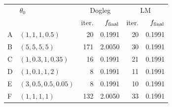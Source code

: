 \begin{tabular}{llrrrr}\toprule
& $\theta_0$ & \multicolumn{2}{c}{Dogleg} & \multicolumn{2}{c}{LM} \\
& & iter. & $f_{\rm final}$ & iter. & $f_{\rm final}$ \\\midrule
A & $(1, 1, 1, 0.5)$ & 20 & 0.1991 & 20 & 0.1991 \\
B & $(5, 5, 5, 5)$ & 171 & 2.0050 & 30 & 0.1991 \\
C & $(1, 0.3, 1, 0.35)$ & 16 & 0.1991 & 21 & 0.1991 \\
D & $(1, 0.1, 1, 2)$ & 8 & 0.1991 & 11 & 0.1991 \\
E & $(3, 0.5, 0.5, 0.05)$ & 8 & 0.1991 & 10 & 0.1991 \\
F & $(1, 1, 1, 1)$ & 132 & 2.0050 & 33 & 0.1991 \\
\bottomrule\end{tabular}
